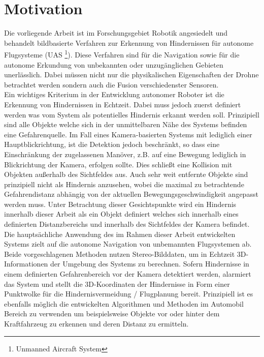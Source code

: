 \section{Motivation}
\label{sec:motivation}

Die vorliegende Arbeit ist im Forschungsgebiet Robotik angesiedelt und behandelt bildbasierte Verfahren zur Erkennung von Hindernissen für autonome Flugsysteme (UAS \footnote{Unmanned Aircraft System}). Diese Verfahren sind für die Navigation sowie für die autonome Erkundung von unbekannten oder unzugänglichen Gebieten unerlässlich. Dabei müssen nicht nur die physikalischen Eigenschaften der Drohne betrachtet werden sondern auch die Fusion verschiedenster Sensoren.\\

\noindent
Ein wichtiges Kriterium in der Entwicklung autonomer Roboter ist die Erkennung von Hindernissen in Echtzeit. Dabei muss jedoch zuerst definiert werden was vom System als potentielles Hindernis erkannt werden soll. Prinzipiell sind alle Objekte welche sich in der unmittelbaren Nähe des Systems befinden eine Gefahrenquelle. Im Fall eines Kamera-basierten Systems mit lediglich einer Hauptblickrichtung, ist die Detektion jedoch beschränkt, so dass eine Einschränkung der zugelassenen Manöver, z.B. auf eine Bewegung lediglich in Blickrichtung der Kamera, erfolgen sollte. Dies schließt eine Kollision mit Objekten außerhalb des Sichtfeldes aus. Auch sehr weit entfernte Objekte sind prinzipiell nicht als Hindernis anzusehen, wobei die maximal zu betrachtende Gefahrendistanz abhängig von der aktuellen Bewegungsgeschwindigkeit angepasst werden muss. Unter Betrachtung dieser Gesichtspunkte wird ein Hindernis innerhalb dieser Arbeit als ein Objekt definiert welches sich innerhalb eines definierten Distanzbereichs und innerhalb des Sichtfeldes der Kamera befindet.\\

\noindent
Die hauptsächliche Anwendung des im Rahmen dieser Arbeit entwickelten Systems zielt auf die autonome Navigation von unbemannten Flugsystemen ab. Beide vorgeschlagenen Methoden nutzen Stereo-Bilddaten, um in Echtzeit 3D-Informationen der Umgebung des Systems zu berechnen. Sofern Hindernisse in einem definierten Gefahrenbereich vor der Kamera detektiert werden, alarmiert das System und stellt die 3D-Koordinaten der Hindernisse in Form einer Punktwolke für die Hindernisvermeidung / Flugplanung bereit. Prinzipiell ist es ebenfalls möglich die entwickelten Algorithmen und Methoden im Automobil Bereich zu verwenden um beispielsweise Objekte vor oder hinter dem Kraftfahrzeug zu erkennen und deren Distanz zu ermitteln. 

